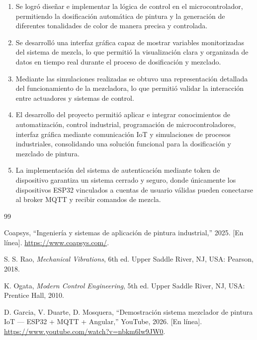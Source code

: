\documentclass[conference]{IEEEtran}
\begin{document}
\begin{enumerate}
    \item Se logr\'o dise\~nar e implementar la l\'ogica de control en el microcontrolador, permitiendo la dosificaci\'on autom\'atica de pintura y la generaci\'on de diferentes tonalidades de color de manera precisa y controlada.

    \item Se desarroll\'o una interfaz gr\'afica capaz de mostrar variables monitorizadas del sistema de mezcla, lo que permiti\'o la visualizaci\'on clara y organizada de datos en tiempo real durante el proceso de dosificaci\'on y mezclado.

    \item Mediante las simulaciones realizadas se obtuvo una representaci\'on detallada del funcionamiento de la mezcladora, lo que permiti\'o validar la interacci\'on entre actuadores y sistemas de control.

    \item El desarrollo del proyecto permiti\'o aplicar e integrar conocimientos de automatizaci\'on, control industrial, programaci\'on de microcontroladores, interfaz gr\'afica mediante comunicaci\'on IoT y simulaciones de procesos industriales, consolidando una soluci\'on funcional para la dosificaci\'on y mezclado de pintura.

    \item La implementaci\'on del sistema de autenticaci\'on mediante token de dispositivo garantiza un sistema cerrado y seguro, donde \'unicamente los dispositivos ESP32 vinculados a cuentas de usuario v\'alidas pueden conectarse al broker MQTT y recibir comandos de mezcla.
\end{enumerate}


\begin{thebibliography}{99}

Coapsys, ``Ingenier\'ia y sistemas de aplicaci\'on de pintura industrial,'' 2025. [En l\'inea]. \url{https://www.coapsys.com/}.

S. S. Rao, \textit{Mechanical Vibrations}, 6th ed. Upper Saddle River, NJ, USA: Pearson, 2018.

K. Ogata, \textit{Modern Control Engineering}, 5th ed. Upper Saddle River, NJ, USA: Prentice Hall, 2010.

D. Garcia, V. Duarte, D. Mosquera, ``Demostraci\'on sistema mezclador de pintura IoT --- ESP32 + MQTT + Angular,'' YouTube, 2026. [En l\'inea]. \url{https://www.youtube.com/watch?v=nbkm6lw9JW0}.

\end{thebibliography}
\end{document}
